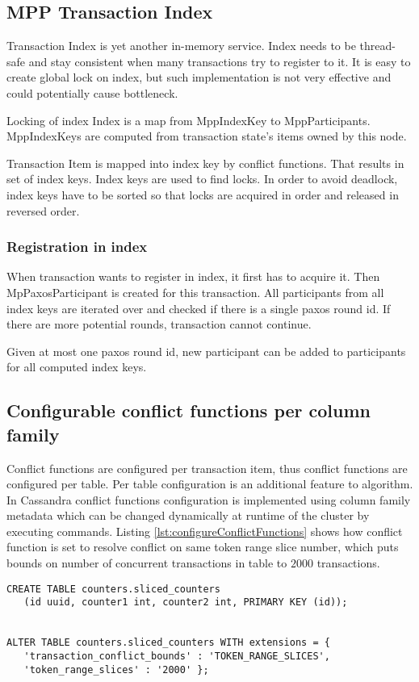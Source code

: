 \subsection{MPP Transaction Index}
Transaction Index is yet another in-memory service. Index needs to be thread-safe and stay consistent when many transactions try to register to it. It is easy to create global lock on index, but such implementation is not very effective and could potentially cause bottleneck. 


Locking of index
Index is a map from MppIndexKey to MppParticipants. MppIndexKeys are computed from transaction state’s items owned by this node. 


Transaction Item is mapped into index key by conflict functions. That results in set of index keys. Index keys are used to find locks. In order to avoid deadlock, index keys have to be sorted so that locks are acquired in order and released in reversed order.


\subsubsection{Registration in index}
When transaction wants to register in index, it first has to acquire it. Then MpPaxosParticipant is created for this transaction. All participants from all index keys are iterated over and checked if there is a single paxos round id. If there are more potential rounds, transaction cannot continue. 


Given at most one paxos round id, new participant can be added to participants for all computed index keys.


\subsection{Configurable conflict functions per column family}
Conflict functions are configured per transaction item, thus conflict functions are configured per table. Per table configuration is an additional feature to algorithm. In Cassandra conflict functions configuration is implemented using column family metadata which can be changed dynamically at runtime of the cluster by executing  commands. Listing \ref{lst:configureConflictFunctions} shows how conflict function is set to resolve conflict on same token range slice number, which puts bounds on number of concurrent transactions in table  to $2000$ transactions. 

\begin{lstlisting}[style=outcode,label={lst:configureConflictFunctions},caption={Configuring conflict function on Cassandra table}]
CREATE TABLE counters.sliced_counters 
   (id uuid, counter1 int, counter2 int, PRIMARY KEY (id));


ALTER TABLE counters.sliced_counters WITH extensions = { 
   'transaction_conflict_bounds' : 'TOKEN_RANGE_SLICES', 
   'token_range_slices' : '2000' };
\end{lstlisting}

